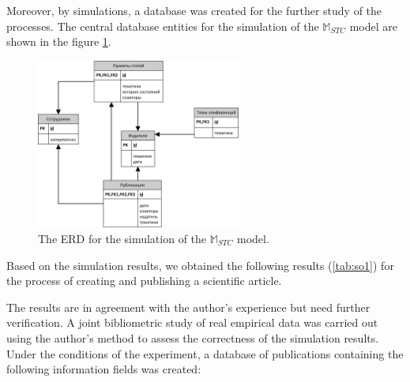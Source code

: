 \documentclass[12pt]{report}
\theoremstyle{definition}
\begin{document}
Moreover, by simulations, a database was created for the further study of the processes. 
The central database entities for the simulation of the $\mathbb{M}_{STC}$ model  are shown in the figure \ref{fig:so2}.  

\begin{figure}[ht]
	\centering
	\includegraphics[width=0.6\textwidth]{so2}
	\caption{The ERD for the simulation of the $\mathbb{M}_{STC}$ model.}
	\label{fig:so2}
\end{figure}  

Based on the simulation results, we obtained the following results (\ref{tab:so1}) for the process of creating and publishing a scientific article.

\begin{table}[H]
	\centering
	\caption{The results of simulation of the $\mathbb{M}_{STC}$ model.}
	\label{tab:so1}
\end{table}

The results are in agreement with the author's experience but need further verification.
A joint bibliometric study of real empirical data was carried out using the author's method \cite{KDGY} to assess the correctness of the simulation results. 
Under the conditions of the experiment, a database of publications containing the following information fields was created:
\end{document}
